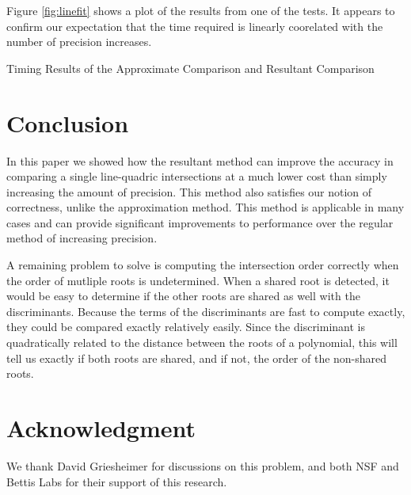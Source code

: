 \documentclass{cccg16}
\begin{document}
Figure \ref{fig:linefit} shows a plot of the results from one of the
tests.  It appears to confirm our expectation that the time required
is linearly coorelated with the number of precision increases.

\begin{table}
  \caption{Timing Results of the Approximate Comparison and Resultant Comparison}
  \label{tab:times}
  
\end{table}

\section{Conclusion}
In this paper we showed how the resultant method can improve the
accuracy in comparing a single line-quadric intersections at a much
lower cost than simply increasing the amount of precision.  This
method also satisfies our notion of correctness, unlike the
approximation method.  This method is applicable in many cases and can
provide significant improvements to performance over the regular
method of increasing precision.

A remaining problem to solve is computing the intersection order
correctly when the order of mutliple roots is undetermined.  When a
shared root is detected, it would be easy to determine if the other
roots are shared as well with the discriminants.  Because the terms of
the discriminants are fast to compute exactly, they could be compared
exactly relatively easily.  Since the discriminant is quadratically
related to the distance between the roots of a polynomial, this will
tell us exactly if both roots are shared, and if not, the order of the
non-shared roots.

\section{Acknowledgment}
We thank David Griesheimer for discussions on this problem, and both NSF and Bettis Labs for their support of this research. 



\end{document}
